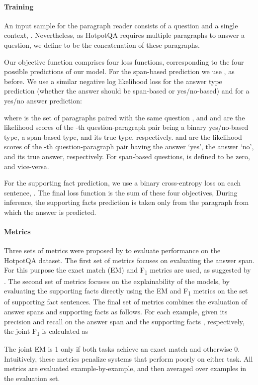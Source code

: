 \documentclass[11pt,a4paper,dvipsnames]{article}
\newcommand\fone{F\textsubscript{1} }
\begin{document}
\paragraph{Training}
An input sample for the paragraph reader consists of a question and a single context, . Nevertheless, as HotpotQA requires multiple paragraphs to answer a question, we define  to be the concatenation of these paragraphs. \par
Our objective function comprises four loss functions, corresponding to the four possible predictions of our model. For the span-based prediction we use , as before. 
We use a similar negative log likelihood loss for the answer type prediction (whether the answer should be span-based or yes/no-based) and for a yes/no answer prediction:


where  is the set of paragraphs paired with the same question , and  and  are the likelihood scores of the -th question-paragraph pair being a binary yes/no-based type, a span-based type, and its true type, respectively.  and  are the likelihood scores of the -th question-paragraph pair having the answer `yes', the answer `no', and its true answer, respectively. For span-based questions,  is defined to be zero, and vice-versa. \par
For the supporting fact prediction, we use a binary cross-entropy loss on each sentence, . The final loss function is the sum of these four objectives, 
During inference, the supporting facts prediction is taken only from the paragraph from which the answer is predicted.

\paragraph{Metrics}
Three sets of metrics were proposed by \citet{Yang0ZBCSM18hotpot} to evaluate performance on the HotpotQA dataset. The first set of metrics focuses on evaluating the answer span. For this purpose the exact match (EM) and \fone metrics are used, as suggested by \citet{RajpurkarZLL16squad}. The second set of metrics focuses on the explainability of the models, by evaluating the supporting facts directly using the EM and \fone metrics on the set of supporting fact sentences. The final set of metrics combines the evaluation of answer spans and supporting facts as follows. For each example, given its precision and recall on the answer span  and the supporting facts , respectively, the joint \fone is calculated as


The joint EM is 1 only if both tasks achieve an exact match and otherwise 0. Intuitively, these metrics penalize systems that perform poorly on either task. All metrics are evaluated example-by-example, and then averaged over examples in the evaluation set.
\end{document}
